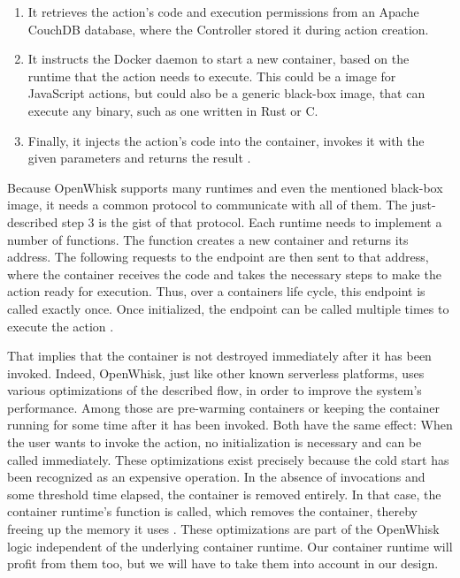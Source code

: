 \begin{enumerate}
    \item It retrieves the action's code and execution permissions from an Apache CouchDB database, where the Controller stored it during action creation.
    \item It instructs the Docker daemon to start a new container, based on the runtime that the action needs to execute. This could be a  image for JavaScript actions, but could also be a generic  black-box image, that can execute any binary, such as one written in Rust or C.
    \item Finally, it injects the action's code into the container, invokes it with the given parameters and returns the result \cite{OpenWhiskSystemDesign}.
\end{enumerate}

Because OpenWhisk supports many runtimes and even the mentioned black-box image, it needs a common protocol to communicate with all of them. The just-described step 3 is the gist of that protocol. Each runtime needs to implement a number of functions. The  function creates a new container and returns its address. The following requests to the  endpoint are then sent to that address, where the container receives the code and takes the necessary steps to make the action ready for execution. Thus, over a containers life cycle, this endpoint is called exactly once. Once initialized, the  endpoint can be called multiple times to execute the action \cite{OpenWhiskSystemDesign}.

That implies that the container is not destroyed immediately after it has been invoked. Indeed, OpenWhisk, just like other known serverless platforms, uses various optimizations of the described flow, in order to improve the system's performance. Among those are pre-warming containers or keeping the container running for some time after it has been invoked. Both have the same effect: When the user wants to invoke the action, no initialization is necessary and  can be called immediately. These optimizations exist precisely because the cold start has been recognized as an expensive operation. In the absence of invocations and some threshold time elapsed, the container is removed entirely. In that case, the container runtime's  function is called, which removes the container, thereby freeing up the memory it uses \cite{OpenWhiskSystemDesign}. These optimizations are part of the OpenWhisk logic independent of the underlying container runtime. Our container runtime will profit from them too, but we will have to take them into account in our design.

